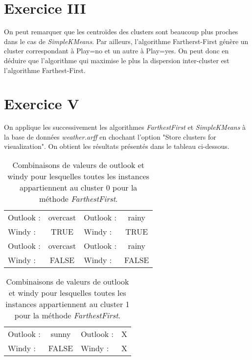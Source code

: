\documentclass[a4paper, 11pt]{report}
\begin{document}
        \section{Exercice III}
        On peut remarquer que les centroïdes des clusters sont beaucoup plus proches dans le cas de \emph{SimpleKMeans}. Par ailleurs, l'algorithme Fartherst-First génère un cluster correspondant à Play=no et un autre à Play=yes. On peut donc en déduire que l'algorithme qui maximise le plus la dispersion inter-cluster est l'algorithme Farthest-First.
        
	\section{Exercice V}
	On applique les successivement les algorithmes \emph{FarthestFirst } et \emph{SimpleKMeans} à la base de données \emph{weather.arff} en chochant l'option "Store clusters for visualization". On obtient les résultats présentés dans le tableau ci-dessous.

	\begin{table}[h!]
		\centering
		\begin{tabular}{|l|c|l|c|}
			\hline
			Outlook : & overcast  & Outlook : & rainy \\
			Windy : & TRUE & Windy : & TRUE \\
			\hline
			Outlook : & overcast & Outlook : & rainy \\
			Windy : & FALSE & Windy : & FALSE \\
			\hline
		\end{tabular}
		\caption{Combinaisons de valeurs de outlook et windy pour lesquelles toutes les instances appartiennent au cluster 0 pour la méthode \emph{FarthestFirst}.}
		\label{tab:exo5-1}
	\end{table}


	\begin{table}[h!]
		\centering
		\begin{tabular}{|l|c|l|c|}
			\hline
			Outlook : & sunny & Outlook : & X \\
			Windy : & FALSE & Windy : & X \\
			\hline
		\end{tabular}
		\caption{Combinaisons de valeurs de outlook et windy pour lesquelles toutes les instances appartiennent au cluster 1 pour la méthode \emph{FarthestFirst}.}
		\label{tab:exo5-1}
	\end{table}
\end{document}
